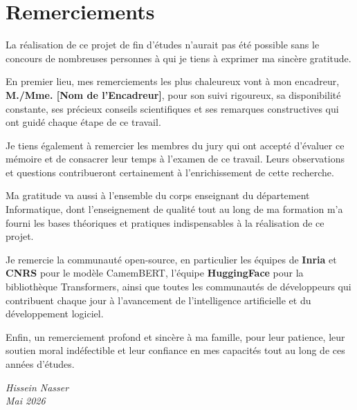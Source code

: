 \chapter*{Remerciements}

\vspace{0.5cm}

La réalisation de ce projet de fin d'études n'aurait pas été possible sans
le concours de nombreuses personnes à qui je tiens à exprimer ma sincère
gratitude.

\vspace{0.5cm}

En premier lieu, mes remerciements les plus chaleureux vont à mon encadreur,
\textbf{M./Mme. [Nom de l'Encadreur]}, pour son suivi rigoureux, sa
disponibilité constante, ses précieux conseils scientifiques et ses remarques
constructives qui ont guidé chaque étape de ce travail.

\vspace{0.5cm}

Je tiens également à remercier les membres du jury qui ont accepté d'évaluer
ce mémoire et de consacrer leur temps à l'examen de ce travail. Leurs
observations et questions contribueront certainement à l'enrichissement
de cette recherche.

\vspace{0.5cm}

Ma gratitude va aussi à l'ensemble du corps enseignant du département
Informatique, dont l'enseignement de qualité tout au long de ma formation
m'a fourni les bases théoriques et pratiques indispensables à la réalisation
de ce projet.

\vspace{0.5cm}

Je remercie la communauté open-source, en particulier les équipes de
\textbf{Inria} et \textbf{CNRS} pour le modèle CamemBERT, l'équipe
\textbf{HuggingFace} pour la bibliothèque Transformers, ainsi que toutes les
communautés de développeurs qui contribuent chaque jour à l'avancement de
l'intelligence artificielle et du développement logiciel.

\vspace{0.5cm}

Enfin, un remerciement profond et sincère à ma famille, pour leur patience,
leur soutien moral indéfectible et leur confiance en mes capacités tout au
long de ces années d'études.

\vspace{1cm}

\begin{flushright}
\textit{Hissein Nasser}\\
\textit{Mai 2026}
\end{flushright}

\cleardoublepage
